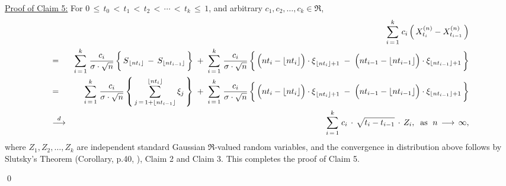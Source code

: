 \begin{enumerate}
		\vskip 0.5cm
		\noindent
		\underline{Proof of Claim 5:}\quad
		For $0 \,\leq\, t_{0} \,<\, t_{1} \,<\, t_{2} \,<\, \cdots \,<\, t_{k} \,\leq\, 1$,
		and arbitrary $c_{1}, c_{2}, \ldots, c_{k} \in \Re$,
		\begin{eqnarray*}
		&& \overset{k}{\underset{i\,=\,1}{\sum}} \; c_{i}\left(\,X^{(n)}_{t_{i}} - X^{(n)}_{t_{i-1}}\,\right)
		\\
		&=&
		\overset{k}{\underset{i\,=\,1}{\sum}} \; \dfrac{c_{i}}{\sigma\cdot\sqrt{n}}
		\left\{\,
			\overset{{\color{white}1}}{S}_{\lfloor nt_{i} \rfloor} \,-\, S_{\lfloor nt_{i-1} \rfloor}
		\,\right\}
		\;+\;
		\overset{k}{\underset{i\,=\,1}{\sum}} \; \dfrac{c_{i}}{\sigma\cdot\sqrt{n}}
		\left\{\,
			\left(\overset{{\color{white}1}}{n}t_{i} - \lfloor nt_{i} \rfloor\right)\cdot\overset{{\color{white}1}}{\xi}_{\lfloor nt_{i} \rfloor+1}
			\;-\; \left(\overset{{\color{white}1}}{n}t_{i-1} - \lfloor nt_{i-1} \rfloor\right)\cdot\xi_{\lfloor nt_{i-1} \rfloor+1}
		\,\right\}
		\\
		&=&
		\overset{k}{\underset{i\,=\,1}{\sum}} \; \dfrac{c_{i}}{\sigma\cdot\sqrt{n}}
		\left\{\,
			\overset{\lfloor nt_{i} \rfloor}{\underset{j\,=\,1+\lfloor nt_{i-1} \rfloor}{\sum}}\,\xi_{j}
		\,\right\}
		\;+\;
		\overset{k}{\underset{i\,=\,1}{\sum}} \; \dfrac{c_{i}}{\sigma\cdot\sqrt{n}}
		\left\{\,
			\left(\overset{{\color{white}1}}{n}t_{i} - \lfloor nt_{i} \rfloor\right)\cdot\overset{{\color{white}1}}{\xi}_{\lfloor nt_{i} \rfloor+1}
			\;-\; \left(\overset{{\color{white}1}}{n}t_{i-1} - \lfloor nt_{i-1} \rfloor\right)\cdot\xi_{\lfloor nt_{i-1} \rfloor+1}
		\,\right\}
		\\
		&\overset{d}{\longrightarrow}&
		\overset{k}{\underset{i\,=\,1}{\sum}} \; c_{i} \,\cdot\, \sqrt{t_{i} - t_{i-1}} \,\cdot\, Z_{i},
		\;\;\textnormal{as \;$n \,\longrightarrow\, \infty$},
		\end{eqnarray*}
		where $Z_{1}, Z_{2}, \ldots, Z_{k}$ are independent standard Gaussian $\Re$-valued random variables,
		and the convergence in distribution above follows by
		Slutsky's Theorem (Corollary, p.40, \cite{Ferguson1996}), Claim 2 and Claim 3.
		This completes the proof of Claim 5.

\end{enumerate}
\qed

